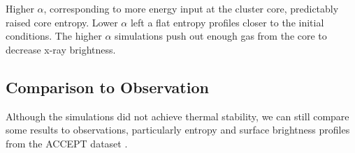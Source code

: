 \documentclass[iop,apjl, twocolappendix]{emulateapj}   %
\begin{document}
Higher $\alpha$, corresponding to more energy input at the cluster core,
predictably raised core entropy. Lower $\alpha$ left a flat entropy
profiles closer to the initial conditions.  The higher $\alpha$
simulations push out enough gas from the core to decrease x-ray
brightness. 

\subsection{Comparison to Observation}
\label{sec:comparison_to_observation}

Although the simulations did not achieve thermal stability, we can still
compare some results to observations, particularly entropy and surface
brightness profiles from the ACCEPT dataset \cite{cavagnolo_intracluster_2009}.
\end{document}
